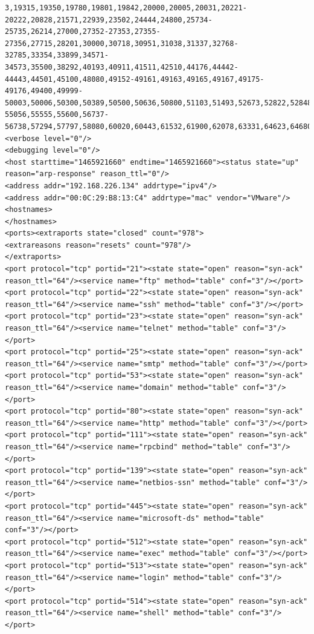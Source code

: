\documentclass[10pt,a4paper,titlepage]{article}
\begin{document}
\begin{verbatim}
3,19315,19350,19780,19801,19842,20000,20005,20031,20221-20222,20828,21571,22939,23502,24444,24800,25734-25735,26214,27000,27352-27353,27355-27356,27715,28201,30000,30718,30951,31038,31337,32768-32785,33354,33899,34571-34573,35500,38292,40193,40911,41511,42510,44176,44442-44443,44501,45100,48080,49152-49161,49163,49165,49167,49175-49176,49400,49999-50003,50006,50300,50389,50500,50636,50800,51103,51493,52673,52822,52848,52869,54045,54328,55055-55056,55555,55600,56737-56738,57294,57797,58080,60020,60443,61532,61900,62078,63331,64623,64680,65000,65129,65389"/>
<verbose level="0"/>
<debugging level="0"/>
<host starttime="1465921660" endtime="1465921660"><status state="up" reason="arp-response" reason_ttl="0"/>
<address addr="192.168.226.134" addrtype="ipv4"/>
<address addr="00:0C:29:B8:13:C4" addrtype="mac" vendor="VMware"/>
<hostnames>
</hostnames>
<ports><extraports state="closed" count="978">
<extrareasons reason="resets" count="978"/>
</extraports>
<port protocol="tcp" portid="21"><state state="open" reason="syn-ack" reason_ttl="64"/><service name="ftp" method="table" conf="3"/></port>
<port protocol="tcp" portid="22"><state state="open" reason="syn-ack" reason_ttl="64"/><service name="ssh" method="table" conf="3"/></port>
<port protocol="tcp" portid="23"><state state="open" reason="syn-ack" reason_ttl="64"/><service name="telnet" method="table" conf="3"/></port>
<port protocol="tcp" portid="25"><state state="open" reason="syn-ack" reason_ttl="64"/><service name="smtp" method="table" conf="3"/></port>
<port protocol="tcp" portid="53"><state state="open" reason="syn-ack" reason_ttl="64"/><service name="domain" method="table" conf="3"/></port>
<port protocol="tcp" portid="80"><state state="open" reason="syn-ack" reason_ttl="64"/><service name="http" method="table" conf="3"/></port>
<port protocol="tcp" portid="111"><state state="open" reason="syn-ack" reason_ttl="64"/><service name="rpcbind" method="table" conf="3"/></port>
<port protocol="tcp" portid="139"><state state="open" reason="syn-ack" reason_ttl="64"/><service name="netbios-ssn" method="table" conf="3"/></port>
<port protocol="tcp" portid="445"><state state="open" reason="syn-ack" reason_ttl="64"/><service name="microsoft-ds" method="table" conf="3"/></port>
<port protocol="tcp" portid="512"><state state="open" reason="syn-ack" reason_ttl="64"/><service name="exec" method="table" conf="3"/></port>
<port protocol="tcp" portid="513"><state state="open" reason="syn-ack" reason_ttl="64"/><service name="login" method="table" conf="3"/></port>
<port protocol="tcp" portid="514"><state state="open" reason="syn-ack" reason_ttl="64"/><service name="shell" method="table" conf="3"/></port>

\end{verbatim}
\end{document}
